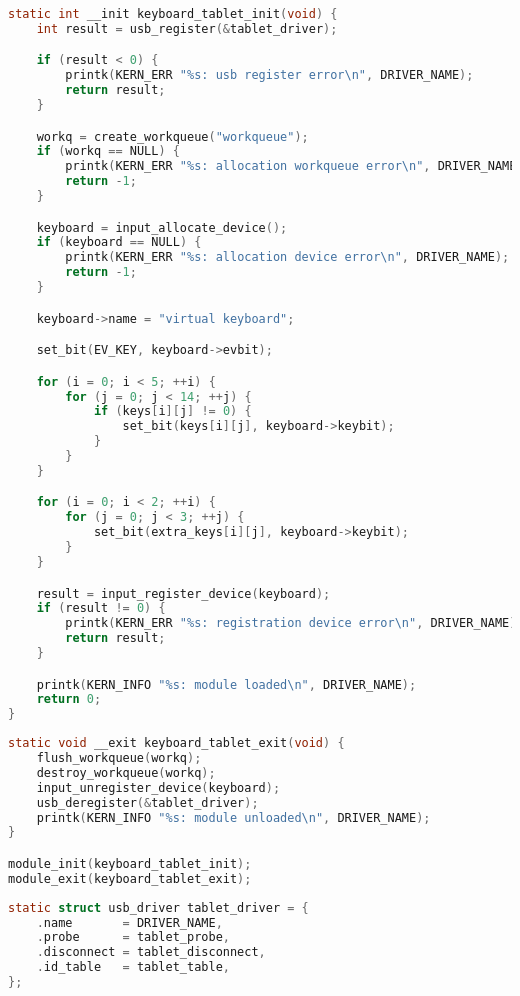 \begin{lstlisting}[language=c,caption=Инициализация модуля,label=lst:init]
static int __init keyboard_tablet_init(void) {
    int result = usb_register(&tablet_driver);

    if (result < 0) {
        printk(KERN_ERR "%s: usb register error\n", DRIVER_NAME);
        return result;
    }

    workq = create_workqueue("workqueue");
    if (workq == NULL) {
        printk(KERN_ERR "%s: allocation workqueue error\n", DRIVER_NAME);
        return -1;
    }

    keyboard = input_allocate_device();
    if (keyboard == NULL) {
        printk(KERN_ERR "%s: allocation device error\n", DRIVER_NAME);
        return -1;
    }

    keyboard->name = "virtual keyboard";

    set_bit(EV_KEY, keyboard->evbit);

    for (i = 0; i < 5; ++i) {
        for (j = 0; j < 14; ++j) {
            if (keys[i][j] != 0) {
                set_bit(keys[i][j], keyboard->keybit);
            }
        }
    }

    for (i = 0; i < 2; ++i) {
        for (j = 0; j < 3; ++j) {
            set_bit(extra_keys[i][j], keyboard->keybit);
        }
    }

    result = input_register_device(keyboard);
    if (result != 0) {
        printk(KERN_ERR "%s: registration device error\n", DRIVER_NAME);
        return result;
    }

    printk(KERN_INFO "%s: module loaded\n", DRIVER_NAME);
    return 0;
}
\end{lstlisting}

\begin{lstlisting}[language=c,caption=Выгруза модуля и установка функций init и exit,label=lst:exit]
static void __exit keyboard_tablet_exit(void) {
    flush_workqueue(workq);
    destroy_workqueue(workq);
    input_unregister_device(keyboard);
    usb_deregister(&tablet_driver);
    printk(KERN_INFO "%s: module unloaded\n", DRIVER_NAME);
}

module_init(keyboard_tablet_init);
module_exit(keyboard_tablet_exit);
\end{lstlisting}

\begin{lstlisting}[language=c,caption=Объявление экземпляра usb драйвера]
static struct usb_driver tablet_driver = {
    .name       = DRIVER_NAME,
    .probe      = tablet_probe,
    .disconnect = tablet_disconnect,
    .id_table   = tablet_table,
};
\end{lstlisting}


